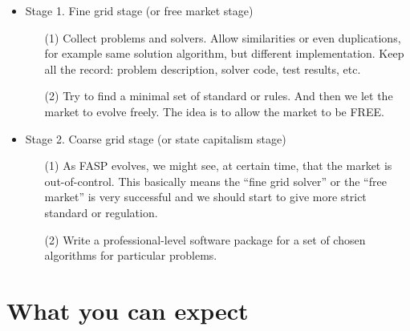 \documentclass[11pt]{memoir}
\begin{document}
\begin{itemize}

\item Stage 1. Fine grid stage (or free market stage)

\begin{enumerate}
\item[(1)] Collect problems and solvers. Allow similarities or even duplications, for example same solution algorithm, but different implementation. Keep all the record: problem description, solver code, test results, etc. 
%
\item[(2)] Try to find a minimal set of standard or rules. And then we let the market to evolve freely. The idea is to allow the market to be FREE. 
\end{enumerate}

\item Stage 2. Coarse grid stage (or state capitalism stage)

\begin{enumerate}
\item[(1)] As FASP evolves, we might see, at certain time, that the market is out-of-control. This basically means the ``fine grid solver'' or the ``free market'' is very successful and we should start to give more strict standard or regulation.
%
\item[(2)] Write a professional-level software package for a set of chosen algorithms for particular problems.
\end{enumerate}
\end{itemize}

\section{What you can expect}\label{sec:idea}
\end{document}
